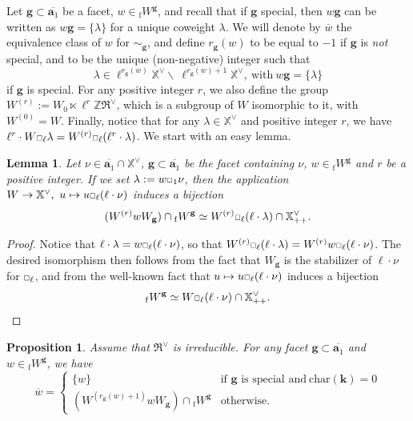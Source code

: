 \documentclass[11pt]{amsart}
\theoremstyle{plain}
\newtheorem{lem}[thm]{Lemma}
\newtheorem{prop}[thm]{Proposition}
\theoremstyle{remark}
\newcommand{\car}{\mbox{\relsize{-5}$\Box$}}
\numberwithin{equation}{section}
\begin{document}
	Let $\mathbf{g}\subset\overline{\mathbf{a}_1}$ be a facet, $w\in {_\mathrm{f}W}^\mathbf{g}$, and recall that if $\mathbf{g}$ special, then $w\mathbf{g}$ can be written as $w\mathbf{g}=\{\lambda\}$ for a unique coweight $\lambda$. We will denote by $\overline{w}$ the equivalence class of $w$ for $\sim_\mathbf{g}$, and define $r_\mathbf{g}(w)$ to be equal to $-1$ if $\mathbf{g}$ is \textit{not} special, and to be the unique (non-negative) integer such that $$\lambda\in \ell^{r_\mathbf{g}(w)}\mathbb{X}^\vee\backslash~ \ell^{r_\mathbf{g}(w)+1}\mathbb{X}^\vee,~\text{with}~w\mathbf{g}=\{\lambda\}$$ if $\mathbf{g}$ is special. For any positive integer $r$, we also define the group $W^{(r)}:=W_0\ltimes \ell^r\mathbb{Z}\mathfrak{R}^\vee$, which is a subgroup of $W$ isomorphic to it, with $W^{(0)}=W$. Finally, notice that for any $\lambda\in\mathbb{X^\vee}$ and positive integer $r$, we have $\ell^r\cdot W\car_\ell\lambda=W^{(r)}\car_\ell (\ell^r\cdot\lambda)$. We start with an easy lemma.
	\begin{lem}\label{param Wr}
	    Let $\nu\in\overline{\mathbf{a}_1}\cap\mathbb{X}^\vee$, $\mathbf{g}\subset\overline{\mathbf{a}_1}$ be the facet containing $\nu$, $w\in {_\mathrm{f}W}^\mathbf{g}$ and $r$ be a positive integer. If we set $\lambda:=w\car_1\nu$, then the application $W\to \mathbb{X}^\vee,~u\mapsto u\car_\ell(\ell\cdot\nu)$ induces a bijection  $$(W^{(r)}wW_\mathbf{g})\cap {_\mathrm{f}W}^\mathbf{g}\simeq W^{(r)}\car_\ell (\ell\cdot\lambda)\cap\mathbb{X}^{\vee}_{++}.$$ 
	\end{lem}
	\begin{proof}
	 Notice that $\ell\cdot\lambda=w\car_\ell(\ell\cdot\nu)$, so that $W^{(r)}\car_\ell (\ell\cdot\lambda)=W^{(r)}w\car_\ell (\ell\cdot\nu)$. The desired isomorphism then follows from the fact that $W_\mathbf{g}$ is the stabilizer of $\ell\cdot\nu$ for $\car_\ell$, and from the well-known fact that $u\mapsto u\car_\ell (\ell\cdot\nu)$ induces a bijection 
	 $${_\mathrm{f}W}^\mathbf{g}\simeq W\car_\ell (\ell\cdot\nu)\cap\mathbb{X}^{\vee}_{++}. $$
	\end{proof}
	\begin{prop}\label{facette speciale}
		Assume that $\mathfrak{R}^\vee$ is irreducible. For any facet $\mathbf{g}\subset\overline{\mathbf{a}_1}$ and $w\in {_\mathrm{f}W}^\mathbf{g}$, we have 
		\begin{equation*}
			\overline{w}=\begin{cases}
			\{w\} & \text{if $\mathbf{g}$ is special and}\ \mathrm{char}(\mathbf{k})=0\\
			(W^{(r_\mathbf{g}(w)+1)}wW_\mathbf{g})\cap {_\mathrm{f}W}^\mathbf{g} & \text{otherwise}.
			\end{cases}
		\end{equation*}
		
	\end{prop}
\end{document}
